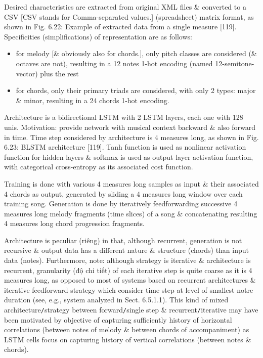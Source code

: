 \documentclass{article}
\begin{document}
\begin{itemize}
\begin{itemize}
\begin{itemize}
			Desired characteristics are extracted from original XML files \& converted to a CSV [CSV stands for Comma-separated values.] (spreadsheet) matrix format, as shown in {\sf Fig. 6.22: Example of extracted data from a single measure [119].} Specificities (simplifications) of representation are as follows:
			\begin{itemize}
				\item for melody [\& obviously also for chords.], only pitch classes are considered (\& octaves are not), resulting in a 12 notes 1-hot encoding (named 12-semitone-vector) plus the rest				
				\item for chords, only their primary triads are considered, with only 2 types: major \& minor, resulting in a 24 chords 1-hot encoding.
			\end{itemize}
			Architecture is a bidirectional LSTM with 2 LSTM layers, each one with 128 unis. Motivation: provide network with musical context backward \& also forward in time. Time step considered by architecture is 4 measures long, as shown in {\sf Fig. 6.23: BLSTM architecture [119]}. Tanh function is used as nonlinear activation function for hidden layers \& softmax is used as output layer activation function, with categorical cross-entropy as its associated cost function.
			
			Training is done with various 4 measures long samples as input \& their associated 4 chords as output, generated by sliding a 4 measures long window over each training song. Generation is done by iteratively feedforwarding successive 4 measures long melody fragments (time slices) of a song \& concatenating resulting 4 measures long chord progression fragments.
			
			Architecture is peculiar (riêng) in that, although recurrent, generation is not recursive \& output data has a different nature \& structure (chords) than input data (notes). Furthermore, note: although strategy is iterative \& architecture is recurrent, granularity (độ chi tiết) of each iterative step is quite coarse as it is 4 measures long, as opposed to most of systems based on recurrent architectures \& iterative feedforward strategy which consider time step at level of smallest notre duration (see, e.g., system analyzed in Sect. 6.5.1.1). This kind of mixed architecture{\tt/}strategy between forward{\tt/}single step \& recurrent{\tt/}iterative may have been motivated by objective of capturing sufficiently history of horizontal correlations (between notes of melody \& between chords of accompaniment) as LSTM cells focus on capturing history of vertical correlations (between notes \& chords).
			

\end{itemize}
\end{itemize}
\end{itemize}
\end{document}
